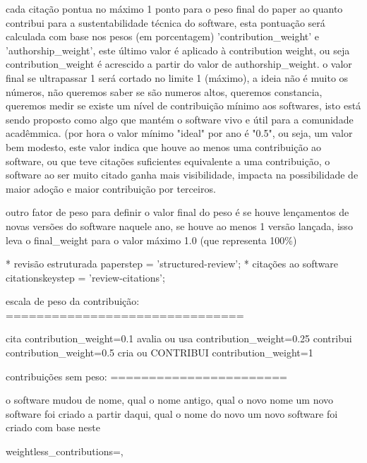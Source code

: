 cada citação pontua no máximo 1 ponto para o peso final do paper ao quanto
contribui para a sustentabilidade técnica do software, esta pontuação será
calculada com base nos pesos (em porcentagem) 'contribution\_weight' e
'authorship\_weight', este último valor é aplicado à contribution weight,
ou seja contribution\_weight é acrescido a partir do valor de authorship\_weight.
o valor final se ultrapassar 1 será cortado no limite 1 (máximo), a ideia não é muito
os números, não queremos saber se são numeros altos, queremos constancia, queremos
medir se existe um nível de contribuição mínimo aos softwares, isto está
sendo proposto como algo que mantém o software vivo e útil para a comunidade
acadêmmica. (por hora o valor mínimo "ideal" por ano é "0.5", ou seja, um
valor bem modesto, este valor indica que houve ao menos uma contribuição
ao software, ou que teve citações suficientes equivalente a uma contribuição,
o software ao ser muito citado ganha mais visibilidade, impacta na possibilidade
de maior adoção e maior contribuição por terceiros.

outro fator de peso para definir o valor final do peso é se houve lençamentos
de novas versões do software naquele ano, se houve ao menos 1 versão lançada,
isso leva o final\_weight para o valor máximo 1.0 (que representa 100\%)

* revisão estruturada
   paper{step} = 'structured-review';
* citações ao software
   citations{key}{step} = 'review-citations';

escala de peso da contribuição:
===============================

cita
  contribution\_weight=0.1
avalia ou usa
  contribution\_weight=0.25
contribui
  contribution\_weight=0.5
cria ou CONTRIBUI
  contribution\_weight=1

contribuições sem peso:
=======================

o software mudou de nome, qual o nome antigo, qual o novo nome
um novo software foi criado a partir daqui, qual o nome do novo
um novo software foi criado com base neste

  weightless\_contributions={},


%
%
%


